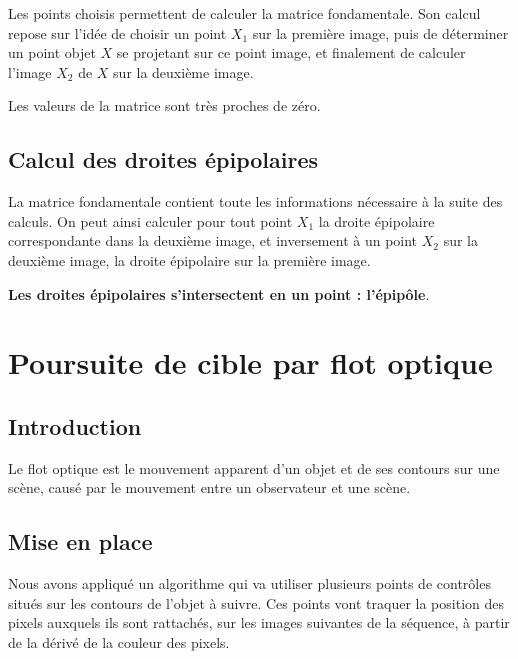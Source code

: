 \documentclass[a4paper,12pt]{article}
\begin{document}
Les points choisis permettent de calculer la matrice fondamentale. Son calcul repose sur l'idée de choisir un point $X_{1}$ sur la première image, puis de déterminer un point objet $X$ se projetant sur ce point image, et finalement de calculer l'image $X_{2}$ de $X$ sur la deuxième image.

Les valeurs de la matrice sont très proches de zéro.



\subsection{Calcul des droites épipolaires}

La matrice fondamentale contient toute les informations nécessaire à la suite des calculs. On peut ainsi calculer pour tout point $X_{1}$ la droite épipolaire correspondante dans la deuxième image, et inversement à un point $X_{2}$ sur la deuxième image, la droite épipolaire sur la première image.

\textbf{Les droites épipolaires s'intersectent en un point : l'épipôle}.

\newpage
\section{Poursuite de cible par flot optique}

\subsection{Introduction}
Le flot optique est le mouvement apparent d'un objet et de ses contours sur une scène, causé par le mouvement entre un observateur et une scène.

\subsection{Mise en place}

Nous avons appliqué un algorithme qui va utiliser plusieurs points de contrôles situés sur les contours de l'objet à suivre. Ces points vont traquer la position des pixels auxquels ils sont rattachés, sur les images suivantes de la séquence, à partir de la dérivé de la couleur des pixels.
\end{document}

